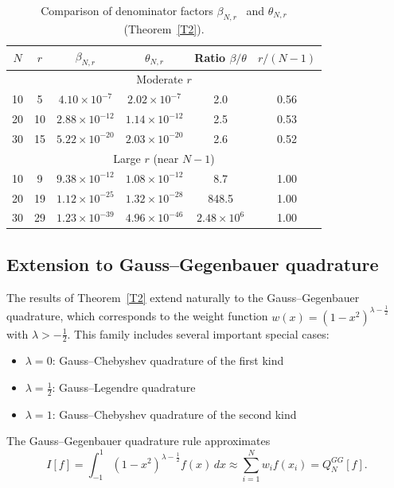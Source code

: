 \documentclass[12pt,a4paper]{article}
\begin{document}
\begin{table}[!htbp]
    \centering
    \caption{Comparison of denominator factors $\beta_{N,r}$~\cite{Xi} and $\theta_{N,r}$ (Theorem~\ref{T2}).\label{tab:comparison}}
    \begin{tabular}{@{}cccccc@{}}
        \toprule
        $N$ & $r$ & $\beta_{N,r}$ & $\theta_{N,r}$ & Ratio $\beta/\theta$ & $r/(N-1)$ \\
        \midrule
        \multicolumn{6}{c}{Moderate $r$} \\
        10 & 5 & $4.10 \times 10^{-7}$ & $2.02 \times 10^{-7}$ & 2.0 & 0.56 \\
        20 & 10 & $2.88 \times 10^{-12}$ & $1.14 \times 10^{-12}$ & 2.5 & 0.53 \\
        30 & 15 & $5.22 \times 10^{-20}$ & $2.03 \times 10^{-20}$ & 2.6 & 0.52 \\
        \midrule
        \multicolumn{6}{c}{Large $r$ (near $N-1$)} \\
        10 & 9 & $9.38 \times 10^{-12}$ & $1.08 \times 10^{-12}$ & 8.7 & 1.00 \\
        20 & 19 & $1.12 \times 10^{-25}$ & $1.32 \times 10^{-28}$ & 848.5 & 1.00 \\
        30 & 29 & $1.23 \times 10^{-39}$ & $4.96 \times 10^{-46}$ & $2.48\times 10^6$ & 1.00 \\
        \bottomrule
    \end{tabular}
\end{table}

\subsection*{Extension to Gauss--Gegenbauer quadrature}

The results of Theorem~\ref{T2} extend naturally to the Gauss--Gegenbauer quadrature, which corresponds to the weight function $w(x) = (1-x^2)^{\lambda-\frac{1}{2}}$ with $\lambda > -\frac{1}{2}$. This family includes several important special cases:
\begin{itemize}
    \item $\lambda = 0$: Gauss--Chebyshev quadrature of the first kind
    \item $\lambda = \frac{1}{2}$: Gauss--Legendre quadrature  
    \item $\lambda = 1$: Gauss--Chebyshev quadrature of the second kind
\end{itemize}

The Gauss--Gegenbauer quadrature rule approximates
\begin{equation}\label{GG}
I[f] = \int_{-1}^{1} (1-x^2)^{\lambda-\frac{1}{2}} f(x)\,dx \approx \sum_{i=1}^{N} w_i f(x_i) = Q_N^{GG}[f].
\end{equation}
\end{document}
